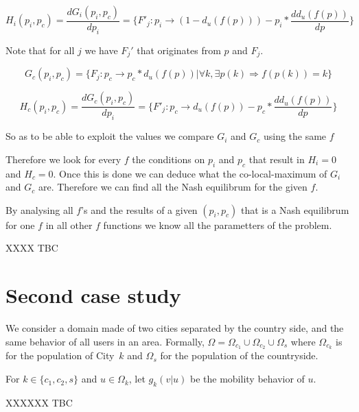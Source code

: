 \documentclass{article}
\begin{document}
$$H_i(p_i,p_c) = \dfrac{d G_i(p_i,p_c)}{dp_i} = \{F'_j : p_i \rightarrow (1 - d_u(f(p))) - p_i*\dfrac{dd_u(f(p))}{dp} \}$$

Note that for all $j$ we have $F_j'$ that originates from $p$ and $F_j$.

$$G_c (p_i,p_c) = \{ F_j : p_c \rightarrow p_c *d_u(f(p)) | \forall k, \exists p(k) \Rightarrow f(p(k)) = k \}$$

$$H_c(p_i,p_c) =\dfrac{d G_c(p_i,p_c)}{dp_i} = \{F'_j : p_c \rightarrow d_u(f(p)) - p_c*\dfrac{dd_u(f(p))}{dp} \}$$

So as to be able to exploit the values we compare $G_i$ and $G_c$ using the same $f$ 

Therefore we look for every $f$ the conditions on $p_i$ and $p_c$ that result in $H_i = 0$ and $H_c = 0$. Once this is done we can deduce what the co-local-maximum of $G_i$ and $G_c$ are. Therefore we can find all the Nash equilibrum for the given $f$.

By analysing all $f$'s and the results of a given $(p_i,p_c)$ that is a Nash equilibrum for one $f$ in all other $f$ functions we know all the parametters of the problem.




XXXX TBC

 \section{Second case study}
 
 We consider a domain made of two cities separated by the country side, and the same behavior of all users in an area.
 Formally, $\Omega=\Omega_{c_1}\cup \Omega_{c_2}\cup \Omega_s$ where $\Omega_{c_k}$ is for the population of City~$k$ and $\Omega_s$ for the population of the countryside.
 

 For $k\in \{c_1,c_2,s\}$ and $u\in \Omega_k$, let $g_k(v|u)$ be the mobility behavior of $u$.
 
 
 XXXXXX TBC
 
 


\end{document}
